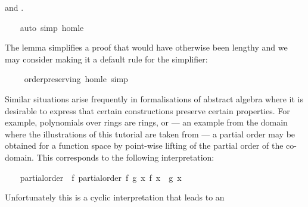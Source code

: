 \begin{isabellebody}
\begin{isamarkuptxt}
       and .%
\end{isamarkuptxt}%
\isamarkuptrue%
\ \ \isamarkupfalse%
\ {}auto\ simp{}\ hom{}le{}%
\endisatagvisible
{\isafoldvisible}%
%
\isadelimvisible
%
\endisadelimvisible
%
\begin{isamarkuptext}%
The lemma 
  simplifies a proof that would have otherwise been lengthy and we may
  consider making it a default rule for the simplifier:%
\end{isamarkuptext}%
\isamarkuptrue%
\ \ \isamarkupfalse%
\ {}\ order{}preserving{}\ hom{}le\ {}simp{}%
\isamarkuptrue%
%
\begin{isamarkuptext}%
Similar situations arise frequently in formalisations of
  abstract algebra where it is desirable to express that certain
  constructions preserve certain properties.  For example, polynomials
  over rings are rings, or --- an example from the domain where the
  illustrations of this tutorial are taken from --- a partial order
  may be obtained for a function space by point-wise lifting of the
  partial order of the co-domain.  This corresponds to the following
  interpretation:%
\end{isamarkuptext}%
\isamarkuptrue%
%
\isadelimvisible
\ \ %
\endisadelimvisible
%
\isatagvisible
{}\isamarkupfalse%
\ partial{}order\ {}\ f{}\ partial{}order\ {}{}f\ g{}\ {}x{}\ f\ x\ {}\ g\ x{}\isanewline
\ \ \ \ \isamarkupfalse%
%
\endisatagvisible
{\isafoldvisible}%
%
\isadelimvisible
%
\endisadelimvisible
%
\begin{isamarkuptext}%
Unfortunately this is a cyclic interpretation that leads to an

\end{isamarkuptext}
\end{isabellebody}
